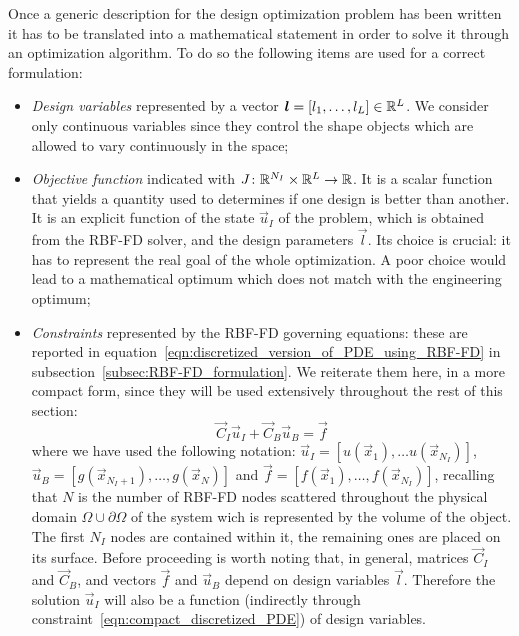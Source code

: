 Once a generic description for the design optimization problem has been written it has to be translated into a mathematical statement in order to solve it through an optimization algorithm. To do so the following items are used for a correct formulation:
\begin{itemize}
	\item \emph{Design variables} represented by a vector $\boldsymbol{l} = \left[ l_1, \dots, l_L \right] \in \mathbb{R}^L$. We consider only continuous variables since they control the shape objects which are allowed to vary continuously in the space;
	
	\item \emph{Objective function} indicated with $J \colon \mathbb{R}^{N_I}\times\mathbb{R}^L \to \mathbb{R}$. It is a scalar function that yields a quantity used to determines if one design is better than another. It is an explicit function of the state $\vec{u}_I$ of the problem, which is obtained from the RBF-FD solver, and the design parameters $\vec{l}$. Its choice is crucial: it has to represent the real goal of the whole optimization. A poor choice would lead to a mathematical optimum which does not match with the engineering optimum;
	\item \emph{Constraints} represented by the RBF-FD governing equations: these are reported in equation~\eqref{eqn:discretized_version_of_PDE_using_RBF-FD} in subsection~\ref{subsec:RBF-FD_formulation}. We reiterate them here, in a more compact form, since they will be used extensively throughout the rest of this section:
	\begin{equation}
		\label{eqn:compact_discretized_PDE}
		\vec{C}_I \vec{u}_I + \vec{C}_B \vec{u}_B = \vec{f}
	\end{equation}
	where we have used the following notation: $\vec{u}_I = \left[ u(\vec{x}_1), \dots u(\vec{x}_{N_I}) \right]$, $\vec{u}_B = \left[ g(\vec{x}_{N_I+1}), \dots, g(\vec{x}_N) \right]$ and $\vec{f} = \left[ f(\vec{x}_1), \dots, f(\vec{x}_{N_I}) \right]$, recalling that $N$ is the number of RBF-FD nodes scattered throughout the physical domain $\Omega\cup\partial\Omega$ of the system wich is represented by the volume of the object. The first $N_I$ nodes are contained within it, the remaining ones are placed on its surface.
	Before proceeding is worth noting that, in general, matrices $\vec{C}_I$ and $\vec{C}_B$, and vectors $\vec{f}$ and $\vec{u}_B$ depend on design variables $\vec{l}$. Therefore the solution $\vec{u}_I$ will also be a function (indirectly through constraint~\eqref{eqn:compact_discretized_PDE}) of design variables.
\end{itemize}
